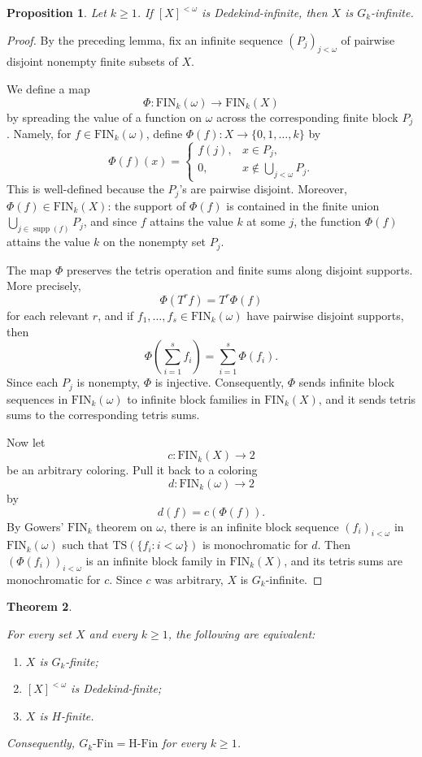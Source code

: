 \documentclass[11pt]{amsart}
\newtheorem{theorem}{Theorem}[section]
\newtheorem{proposition}[theorem]{Proposition}
\theoremstyle{definition}
\DeclareMathOperator{\supp}{supp}
\newcommand{\Fin}{\mathrm{Fin}}
\newcommand{\HFin}{\mathrm{H\text{-}Fin}}
\newcommand{\FIN}{\mathrm{FIN}}
\newcommand{\TS}{\mathrm{TS}}
\begin{document}
\begin{proposition}
Let \(k\geq 1\).  If \([X]^{<\omega}\) is Dedekind-infinite, then \(X\) is \(G_k\)-infinite.
\end{proposition}

\begin{proof}
By the preceding lemma, fix an infinite sequence \((P_j)_{j<\omega}\) of pairwise disjoint nonempty finite subsets of \(X\).

We define a map
\[
    \Phi:\FIN_k(\omega)\to \FIN_k(X)
\]
by spreading the value of a function on \(\omega\) across the corresponding finite block \(P_j\).  Namely, for \(f\in\FIN_k(\omega)\), define \(\Phi(f):X\to\{0,1,\dots,k\}\) by
\[
    \Phi(f)(x)=
    \begin{cases}
        f(j), & x\in P_j,\\
        0, & x\notin \bigcup_{j<\omega}P_j.
    \end{cases}
\]
This is well-defined because the \(P_j\)'s are pairwise disjoint.  Moreover, \(\Phi(f)\in\FIN_k(X)\): the support of \(\Phi(f)\) is contained in the finite union \(\bigcup_{j\in \supp(f)}P_j\), and since \(f\) attains the value \(k\) at some \(j\), the function \(\Phi(f)\) attains the value \(k\) on the nonempty set \(P_j\).

The map \(\Phi\) preserves the tetris operation and finite sums along disjoint supports.  More precisely,
\[
    \Phi(T^r f)=T^r\Phi(f)
\]
for each relevant \(r\), and if \(f_1,\dots,f_s\in\FIN_k(\omega)\) have pairwise disjoint supports, then
\[
    \Phi\left(\sum_{i=1}^s f_i\right)=\sum_{i=1}^s \Phi(f_i).
\]
Since each \(P_j\) is nonempty, \(\Phi\) is injective.  Consequently, \(\Phi\) sends infinite block sequences in \(\FIN_k(\omega)\) to infinite block families in \(\FIN_k(X)\), and it sends tetris sums to the corresponding tetris sums.

Now let
\[
    c:\FIN_k(X)\to 2
\]
be an arbitrary coloring.  Pull it back to a coloring
\[
    d:\FIN_k(\omega)\to 2
\]
by
\[
    d(f)=c(\Phi(f)).
\]
By Gowers' \(\FIN_k\) theorem on \(\omega\), there is an infinite block sequence \((f_i)_{i<\omega}\) in \(\FIN_k(\omega)\) such that \(\TS(\{f_i:i<\omega\})\) is monochromatic for \(d\).  Then \((\Phi(f_i))_{i<\omega}\) is an infinite block family in \(\FIN_k(X)\), and its tetris sums are monochromatic for \(c\).  Since \(c\) was arbitrary, \(X\) is \(G_k\)-infinite.
\end{proof}

\begin{theorem}\label{thm:gowers-collapse}
\begin{samepage}
For every set \(X\) and every \(k\geq 1\), the following are equivalent:
\begin{enumerate}[label=(\arabic*)]
    \item \(X\) is \(G_k\)-finite;
    \item \([X]^{<\omega}\) is Dedekind-finite;
    \item \(X\) is \(H\)-finite.
\end{enumerate}
\end{samepage}
Consequently, \(G_k\text{-}\Fin=\HFin\) for every \(k\geq 1\).
\end{theorem}
\end{document}
